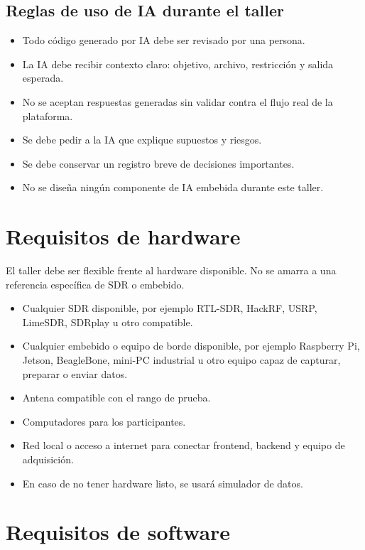 \documentclass[11pt,a4paper]{article}
\begin{document}
\subsection*{Reglas de uso de IA durante el taller}

\begin{itemize}
  \item Todo código generado por IA debe ser revisado por una persona.
  \item La IA debe recibir contexto claro: objetivo, archivo, restricción y salida esperada.
  \item No se aceptan respuestas generadas sin validar contra el flujo real de la plataforma.
  \item Se debe pedir a la IA que explique supuestos y riesgos.
  \item Se debe conservar un registro breve de decisiones importantes.
  \item No se diseña ningún componente de IA embebida durante este taller.
\end{itemize}

\section*{Requisitos de hardware}

El taller debe ser flexible frente al hardware disponible. No se amarra a una referencia específica de SDR o embebido.

\begin{itemize}
  \item Cualquier SDR disponible, por ejemplo RTL-SDR, HackRF, USRP, LimeSDR, SDRplay u otro compatible.
  \item Cualquier embebido o equipo de borde disponible, por ejemplo Raspberry Pi, Jetson, BeagleBone, mini-PC industrial u otro equipo capaz de capturar, preparar o enviar datos.
  \item Antena compatible con el rango de prueba.
  \item Computadores para los participantes.
  \item Red local o acceso a internet para conectar frontend, backend y equipo de adquisición.
  \item En caso de no tener hardware listo, se usará simulador de datos.
\end{itemize}

\section*{Requisitos de software}
\end{document}
